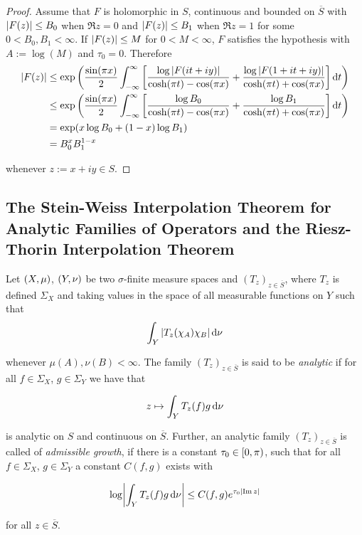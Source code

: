 \begin{proof}
	Assume that $F$ is holomorphic in $S$, continuous and bounded on $\overline{S}$ with $\abs[0]{F( z )} \leq B_0$ when $\Re z = 0$ and $\abs[0]{F( z )} \leq B_1$ when $\Re z = 1$ for some $0 < B_0, B_1 < \infty$. If $\abs[0]{F( z )} \leq M$ for $0 < M < \infty$, $F$ satisfies the hypothesis with $A := \log( M )$ and $\tau_0 = 0$. Therefore 	
	\begin{equation*}
		\begin{aligned}
			\abs[0]{ F(z) } &\leq \exp\del[3]{ \frac{\sin(\pi x)}{2} \int_{-\infty}^\infty \sbr{ \frac{\log \abs[0]{ F(it + iy)}}{\cosh(\pi t) - \cos(\pi x)} + \frac{\log \abs[0]{ F(1 + it + iy)}}{\cosh(\pi t) + \cos(\pi x)} } \d t}\\
			&\leq \exp\del[3]{ \frac{\sin(\pi x)}{2} \int_{-\infty}^\infty \sbr{ \frac{\log B_0}{\cosh(\pi t) - \cos(\pi x)} + \frac{\log B_1}{\cosh(\pi t) + \cos(\pi x)} } \d t}\\
		&= \exp( x\log B_0 + ( 1 - x)\log B_1 )\\
		&= B_0^xB_1^{1 - x}
		\end{aligned}
	\end{equation*}

	\noindent whenever $z := x + iy \in S$.
\end{proof}

\subsection{The Stein-Weiss Interpolation Theorem for Analytic Families of Operators and the Riesz-Thorin Interpolation Theorem}
\begin{definition}
	Let $\del{X,\mu}$, $\del{Y,\nu}$ be two $\sigma$-finite measure spaces and $( T_z )_{z \in \overline{S}}$, where $T_z$ is defined $\Sigma_X$ and taking values in the space of all measurable functions on $Y$ such that
	\begin{equation}
		\int_Y \abs[0]{ T_z(\chi_A)\chi_B} \d\nu
	\end{equation}

		\noindent whenever $\mu(A),\nu(B) < \infty$. The family $( T_z )_{z \in \overline{S}}$ is said to be \emph{analytic} if for all $f \in \Sigma_X$, $g \in \Sigma_Y$ we have that

		\begin{equation}
			z \mapsto \int_Y T_z(f)g\mathop{}\!\mathrm{d}\nu
		\end{equation}

		\noindent is analytic on $S$ and continuous on $\overline{S}$. Further, an analytic family $( T_z )_{z \in \overline{S}}$ is called of \emph{admissible growth}, if there is a constant $\tau_0 \in \intco{0,\pi}$, such that for all $f \in \Sigma_X$, $g \in \Sigma_Y$ a constant $C(f,g)$ exists with

			\begin{equation}
				\log\abs[3]{ \int_Y T_z(f) g \d\nu} \leq C(f,g)e^{\tau_0\abs[0]{ \Im z}}
			\end{equation}

			\noindent for all $z \in \overline{S}$.
	\end{definition}


